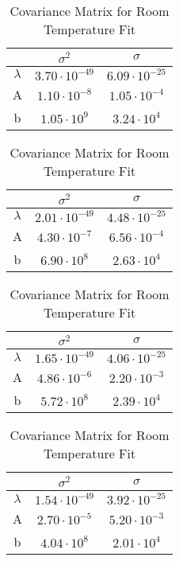 \documentclass[10pt,letterpaper,onecolumn]{article}
\begin{document}
\begin{table}[h]

{
{%
\begin {center}
\begin {tabular} {c | c | c }
\hline\hline
 & $\sigma^{2}$ & $\sigma$ \\
\hline
$\lambda$ &	$3.70\cdot 10^{-49}$ & $6.09\cdot 10^{-25}$\\
\hline
A	& $1.10\cdot 10^{-8}$ & $1.05\cdot 10^{-4}$ \\
\hline
b & $1.05\cdot 10^{9}$ & $3.24\cdot 10^{4}$ \\
\hline
\end {tabular}
\end {center}
}
}
\caption {\label{tab:error}
Covariance Matrix for -5 Degree Fit
 }



{
{%
\begin {center}
\begin {tabular} {c | c | c }
\hline\hline
 & $\sigma^{2}$ & $\sigma$ \\
\hline
$\lambda$ &	$2.01\cdot 10^{-49}$ & $4.48\cdot 10^{-25}$\\
\hline
A	& $4.30\cdot 10^{-7}$ & $6.56\cdot 10^{-4}$ \\
\hline
b & $6.90\cdot 10^{8}$ & $2.63\cdot 10^{4}$ \\
\hline
\end {tabular}
\end {center}
}
}
\caption {\label{tab:error}
Covariance Matrix for 13 Degree Fit
 }




{
{%
\begin {center}
\begin {tabular} {c | c | c }
\hline\hline
 & $\sigma^{2}$ & $\sigma$ \\
\hline
$\lambda$ &	$1.65\cdot 10^{-49}$ & $4.06\cdot 10^{-25}$\\
\hline
A	& $4.86\cdot 10^{-6}$ & $2.20\cdot 10^{-3}$ \\
\hline
b & $5.72\cdot 10^{8}$ & $2.39\cdot 10^{4}$ \\
\hline
\end {tabular}
\end {center}
}
}
\caption {\label{tab:error}
Covariance Matrix for 20 Degree Fit
 }



{
{%
\begin {center}
\begin {tabular} {c | c | c }
\hline\hline
 & $\sigma^{2}$ & $\sigma$ \\
\hline
$\lambda$ &	$1.54\cdot 10^{-49}$ & $3.92\cdot 10^{-25}$\\
\hline
A	& $2.70\cdot 10^{-5}$ & $5.20\cdot 10^{-3}$ \\
\hline
b & $4.04\cdot 10^{8}$ & $2.01\cdot 10^{4}$ \\
\hline
\end {tabular}
\end {center}
}
}
\caption {\label{tab:error}
Covariance Matrix for Room Temperature Fit
 }




\end{table}
\end{document}
